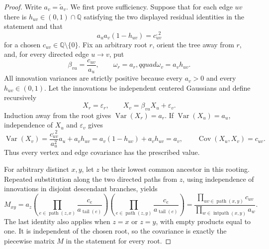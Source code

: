 \documentclass{article}
\begin{document}
\begin{proof}
Write \(a_v=\widetilde a_v\).  We first prove sufficiency.  Suppose that for each edge \(uv\) there is \(h_{uv}\in(0,1)\cap\mathbb Q\) satisfying the two displayed residual identities in the statement and that
\[
 a_u a_v(1-h_{uv})=c_{uv}^{,2}
\]
for a chosen \(c_{uv}\in\mathbb Q\setminus\{0\}\).  Fix an arbitrary root \(r\), orient the tree away from \(r\), and, for every directed edge \(u\to v\), put
\[
 \beta_{vu}=\frac{c_{uv}}{a_u},\qquad
 \omega_r=a_r,qquad
 \omega_v=a_vh_{uv}.
\]
All innovation variances are strictly positive because every \(a_v>0\) and every \(h_{uv}\in(0,1)\).  Let the innovations be independent centered Gaussians and define recursively
\[
 X_r=\varepsilon_r,
 \qquad
 X_v=\beta_{vu}X_u+\varepsilon_v.
\]
Induction away from the root gives \(\operatorname{Var}(X_r)=a_r\).  If \(\operatorname{Var}(X_u)=a_u\), independence of \(X_u\) and \(\varepsilon_v\) gives
\[
 \operatorname{Var}(X_v)
 =\frac{c_{uv}^{,2}}{a_u^2}a_u+a_vh_{uv}
 =a_v(1-h_{uv})+a_vh_{uv}=a_v,
 \qquad
 \operatorname{Cov}(X_u,X_v)=c_{uv}.
\]
Thus every vertex and edge covariance has the prescribed value.

For arbitrary distinct \(x,y\), let \(z\) be their lowest common ancestor in this rooting.  Repeated substitution along the two directed paths from \(z\), using independence of innovations in disjoint descendant branches, yields
\[
 M_{xy}
 =a_z
 \left(\prod_{e\in\operatorname{path}(z,x)}\frac{c_e}{a_{\operatorname{tail}(e)}}\right)
 \left(\prod_{e\in\operatorname{path}(z,y)}\frac{c_e}{a_{\operatorname{tail}(e)}}\right)
 =\frac{\prod_{uv\in\operatorname{path}(x,y)}c_{uv}}
 {\prod_{w\in\operatorname{intpath}(x,y)}a_w}.
\]
The last identity also applies when \(z=x\) or \(z=y\), with empty products equal to one.  It is independent of the chosen root, so the covariance is exactly the piecewise matrix \(M\) in the statement for every root.


\end{proof}
\end{document}
